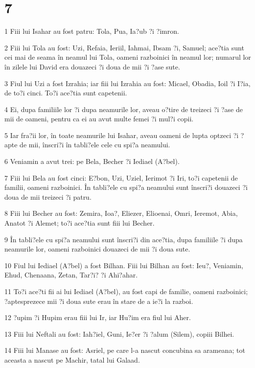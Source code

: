 \chapter{7}

\par 1 Fiii lui Isahar au fost patru: Tola, Pua, Ia?ub ?i ?imron.
\par 2 Fiii lui Tola au fost: Uzi, Refaia, Ieriil, Iahmai, Ibsam ?i, Samuel; ace?tia sunt cei mai de seama în neamul lui Tola, oameni razboinici în neamul lor; numarul lor în zilele lui David era douazeci ?i doua de mii ?i ?ase sute.
\par 3 Fiul lui Uzi a fost Izrahia; iar fiii lui Izrahia au fost: Micael, Obadia, Ioil ?i I?ia, de to?i cinci. To?i ace?tia sunt capetenii.
\par 4 Ei, dupa familiile lor ?i dupa neamurile lor, aveau o?tire de treizeci ?i ?ase de mii de oameni, pentru ca ei au avut multe femei ?i mul?i copii.
\par 5 Iar fra?ii lor, în toate neamurile lui Isahar, aveau oameni de lupta optzeci ?i ?apte de mii, înscri?i în tabli?ele cele cu spi?a neamului.
\par 6 Veniamin a avut trei: pe Bela, Becher ?i Iediael (A?bel).
\par 7 Fiii lui Bela au fost cinci: E?bon, Uzi, Uziel, Ierimot ?i Iri, to?i capetenii de familii, oameni razboinici. În tabli?ele cu spi?a neamului sunt înscri?i douazeci ?i doua de mii treizeci ?i patru.
\par 8 Fiii lui Becher au fost: Zemira, Ioa?, Eliezer, Elioenai, Omri, Ieremot, Abia, Anatot ?i Alemet; to?i ace?tia sunt fiii lui Becher.
\par 9 În tabli?ele cu spi?a neamului sunt înscri?i din ace?tia, dupa familiile ?i dupa neamurile lor, oameni razboinici douazeci de mii ?i doua sute.
\par 10 Fiul lui Iediael (A?bel) a fost Bilhan. Fiii lui Bilhan au fost: Ieu?, Veniamin, Ehud, Chenaana, Zetan, Tar?i? ?i Ahi?ahar.
\par 11 To?i ace?ti fii ai lui Iediael (A?bel), au fost capi de familie, oameni razboinici; ?aptesprezece mii ?i doua sute erau în stare de a ie?i la razboi.
\par 12 ?upim ?i Hupim erau fiii lui Ir, iar Hu?im era fiul lui Aher.
\par 13 Fiii lui Neftali au fost: Iah?iel, Guni, Ie?er ?i ?alum (Silem), copiii Bilhei.
\par 14 Fiii lui Manase au fost: Asriel, pe care l-a nascut concubina sa arameana; tot aceasta a nascut pe Machir, tatal lui Galaad.

